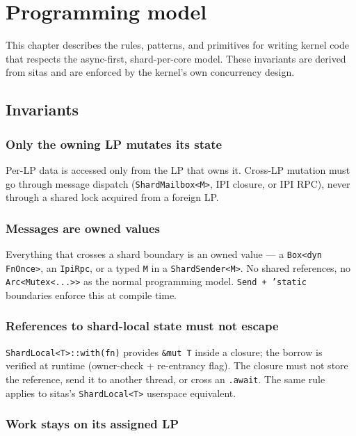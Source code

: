 \chapter{Programming model}

This chapter describes the rules, patterns, and primitives for writing kernel
code that respects the async-first, shard-per-core model. These invariants are
derived from sitas and are enforced by the kernel's own concurrency design.

\section{Invariants}

\subsection{Only the owning LP mutates its state}

Per-LP data is accessed only from the LP that owns it. Cross-LP mutation must
go through message dispatch (\texttt{ShardMailbox<M>}, IPI closure, or IPI
RPC), never through a shared lock acquired from a foreign LP.

\subsection{Messages are owned values}

Everything that crosses a shard boundary is an owned value --- a
\texttt{Box<dyn FnOnce>}, an \texttt{IpiRpc}, or a typed \texttt{M} in a
\texttt{ShardSender<M>}. No shared references, no \texttt{Arc<Mutex<...>>} as
the normal programming model. \texttt{Send + 'static} boundaries enforce this
at compile time.

\subsection{References to shard-local state must not escape}

\texttt{ShardLocal<T>::with(fn)} provides \texttt{\&mut T} inside a closure;
the borrow is verified at runtime (owner-check + re-entrancy flag). The closure
must not store the reference, send it to another thread, or cross an
\texttt{.await}. The same rule applies to sitas's \texttt{ShardLocal<T>}
userspace equivalent.

\subsection{Work stays on its assigned LP}

